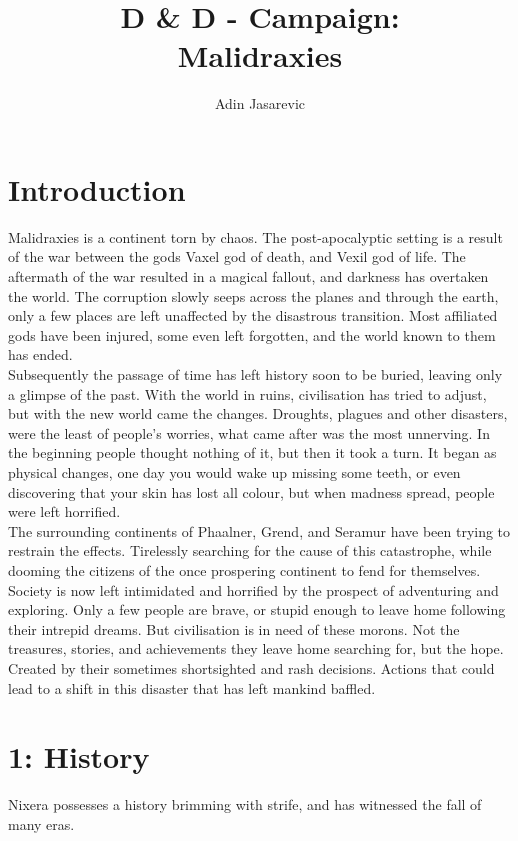 \documentclass[a4paper]{article}
\title{D \& D - Campaign: \\ Malidraxies}
\author{Adin Jasarevic}
\begin{document}
\begin{titlepage}
\maketitle
\end{titlepage}
\makeatletter
\renewcommand\thesection{}
\renewcommand\thesubsection{\@arabic\c@section.\@arabic\c@subsection}
\makeatother
\section{Introduction}
Malidraxies is a continent torn by chaos. The post-apocalyptic setting is a result of the war between the gods Vaxel god of death, and Vexil god of life. The aftermath of the war resulted in a magical fallout, and darkness has overtaken the world. The corruption slowly seeps across the planes and through the earth, only a few places are left unaffected by the disastrous transition. Most affiliated gods have been injured, some even left forgotten, and the world known to them has ended.\\ Subsequently the passage of time has left history soon to be buried, leaving only a glimpse of the past. With the world in ruins, civilisation has tried to adjust, but with the new world came the changes. Droughts, plagues and other disasters, were the least of people's worries, what came after was the most unnerving. In the beginning people thought nothing of it, but then it took a turn. It began as physical changes, one day you would wake up missing some teeth, or even discovering that your skin has lost all colour, but when madness spread, people were left horrified.\\
The surrounding continents of Phaalner, Grend, and Seramur have been trying to restrain the effects. Tirelessly searching for the cause of this catastrophe, while dooming the citizens of the once prospering continent to fend for themselves.\\
Society is now left intimidated and horrified by the prospect of adventuring and exploring. Only a few people are brave, or stupid enough to leave home following their intrepid dreams. But civilisation is in need of these morons. Not the treasures, stories, and achievements they leave home searching for, but the hope. Created by their sometimes shortsighted and rash decisions. Actions that could lead to a shift in this disaster that has left mankind baffled.
\newpage
\tableofcontents
\newpage

\section{1: History}
Nixera possesses a history brimming with strife, and has witnessed the fall of many eras.
\end{document}
